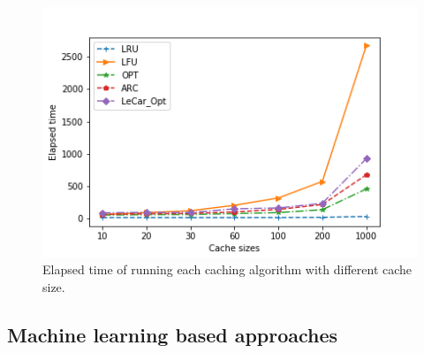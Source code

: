 \documentclass[letterpaper,twocolumn,10pt]{article}
\begin{document}
\begin{figure}[!ht]
	\centering 
	\includegraphics[width=0.38\textheight]{time.png}
	\caption{Elapsed time of running each caching algorithm with different cache size. 
}
	\label{fig:time}
\end{figure}



\begin{table}[]
\centering
{}
\caption{Ratio for LeCar\_Opt elapsed time and ARC elapsed time respect to different cache size. }
\label{tab:my-table}
\end{table}
\subsection{Machine learning based approaches}
\end{document}

